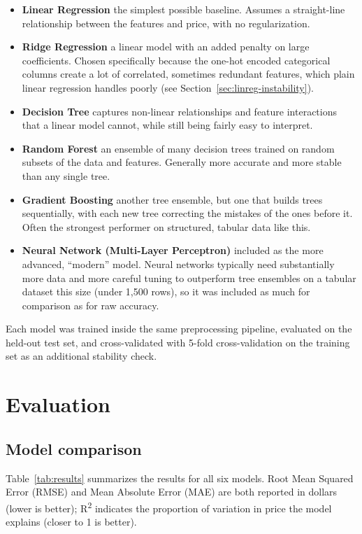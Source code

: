 \documentclass[11pt]{article}
\begin{document}
\begin{itemize}
    \item \textbf{Linear Regression}  the simplest possible baseline. Assumes a
    straight-line relationship between the features and price, with no
    regularization.
    \item \textbf{Ridge Regression}  a linear model with an added penalty on large
    coefficients. Chosen specifically because the one-hot encoded categorical columns
    create a lot of correlated, sometimes redundant features, which plain linear
    regression handles poorly (see Section~\ref{sec:linreg-instability}).
    \item \textbf{Decision Tree}  captures non-linear relationships and feature
    interactions that a linear model cannot, while still being fairly easy to
    interpret.
    \item \textbf{Random Forest}  an ensemble of many decision trees trained on
    random subsets of the data and features. Generally more accurate and more stable
    than any single tree.
    \item \textbf{Gradient Boosting}  another tree ensemble, but one that builds
    trees sequentially, with each new tree correcting the mistakes of the ones before
    it. Often the strongest performer on structured, tabular data like this.
    \item \textbf{Neural Network (Multi-Layer Perceptron)}  included as the more
    advanced, ``modern'' model. Neural networks typically need substantially more
    data and more careful tuning to outperform tree ensembles on a tabular dataset
    this size (under 1,500 rows), so it was included as much for comparison as for
    raw accuracy.
\end{itemize}

Each model was trained inside the same preprocessing pipeline, evaluated on the held-out
test set, and cross-validated with 5-fold cross-validation on the training set as an
additional stability check.

\section{Evaluation}

\subsection{Model comparison}

Table~\ref{tab:results} summarizes the results for all six models. Root Mean Squared
Error (RMSE) and Mean Absolute Error (MAE) are both reported in dollars (lower is
better); R\textsuperscript{2} indicates the proportion of variation in price the model
explains (closer to 1 is better).
\end{document}
